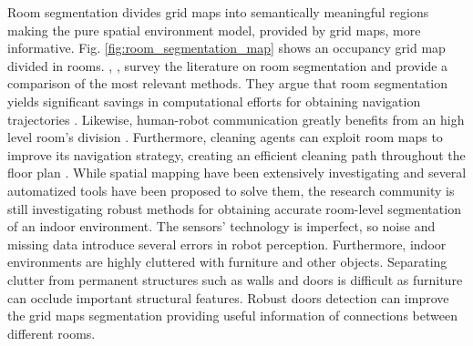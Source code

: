 Room segmentation divides grid maps into semantically meaningful regions making the pure spatial environment model, provided by grid maps, more informative. Fig. \ref{fig:room_segmentation_map} shows an occupancy grid map divided in rooms. \citeauthor{segmentationsurvey}, \cite{segmentationsurvey}, survey the literature on room segmentation and provide a comparison of the most relevant methods. They argue that room segmentation yields significant savings in computational efforts for obtaining navigation trajectories \cite{segmenationfornavigation}. Likewise, human-robot communication greatly benefits from an high level room's division \cite{segmentationhumanrobot}. Furthermore, cleaning agents can exploit room maps to improve its navigation strategy, creating an efficient cleaning path throughout the floor plan \cite{segmentationcleaning}. While spatial mapping have been extensively investigating and several automatized tools have been proposed to solve them, the research community is still investigating robust methods for obtaining accurate room-level segmentation of an indoor environment. The sensors' technology is imperfect, so noise and missing data introduce several errors in robot perception. Furthermore, indoor environments are highly cluttered with furniture and other objects. Separating clutter from permanent structures such as walls and doors is difficult as furniture can occlude important structural features. Robust doors detection can improve the grid maps segmentation providing useful information of connections between different rooms.

